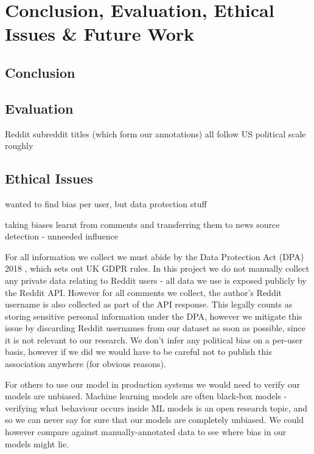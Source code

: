 \chapter{Conclusion, Evaluation, Ethical Issues \& Future Work}

\section{Conclusion}



\section{Evaluation}

Reddit subreddit titles (which form our annotations) all follow US political scale roughly

\section{Ethical Issues}


wanted to find bias per user, but data protection stuff

taking biases learnt from comments and transferring them to news source detection - unneeded influence



For all information we collect we must abide by the Data Protection Act (DPA) 2018 \cite{dpa}, which sets out UK GDPR rules. In this project we do not manually collect any private data relating to Reddit users - all data we use is exposed publicly by the Reddit API. However for all comments we collect, the author's Reddit username is also collected as part of the API response. This legally counts as storing sensitive personal information under the DPA, however we mitigate this issue by discarding Reddit usernames from our dataset as soon as possible, since it is not relevant to our research. We don't infer any political bias on a per-user basis, however if we did we would have to be careful not to publish this association anywhere (for obvious reasons).

For others to use our model in production systems we would need to verify our models are unbiased. Machine learning models are often black-box models - verifying what behaviour occurs inside ML models is an open research topic, and so we can never say for sure that our models are completely unbiased. We could however compare against manually-annotated data to see where bias in our models might lie.



